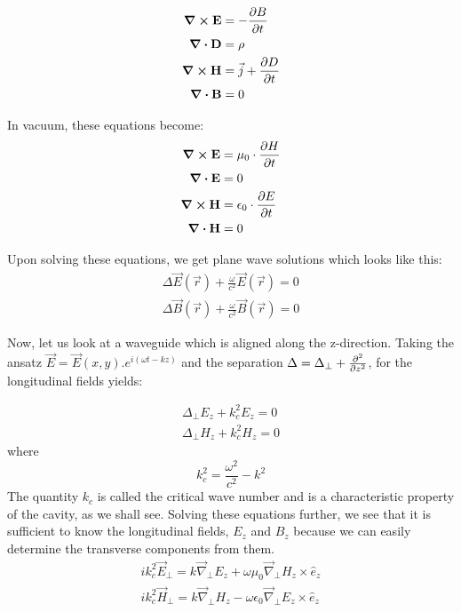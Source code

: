 \documentclass[a4paper]{report}
\numberwithin{equation}{section}
\begin{document}
\begin{align}
		\curl {\vb{{E}}} &= - \pdv{{B}}{t} \\
		\div{\vb{D}} &= \rho \\
		\curl {\vb{{H}}} &= \vec{j} + \pdv{{D}}{t} \\
		\div{\vb{{B}}} &= 0 
\end{align}

In vacuum, these equations become: 
\begin{align}
		\curl {\vb{{E}}} &= \mu_0 \cdot \pdv{{H}}{t} \\ 
		\div{\vb{{E}}} &= 0 \\
		\curl {\vb{{H}}} &= \epsilon_{0} \cdot \pdv{{E}}{t} \\
		\div{\vb{{H}}} &= 0
\end{align}

Upon solving these equations, we get plane wave solutions which looks like this: 
\begin{align*}
		\Delta \vec{E}\left(\vec{r}\right) + \frac{\omega}{c^2} \vec{E}\left(\vec{r}\right) = 0 \\
		\Delta \vec{B}\left(\vec{r}\right) + \frac{\omega}{c^2} \vec{B}\left(\vec{r}\right) = 0 
\end{align*}

Now, let us look at a waveguide which is aligned along the z-direction. Taking
the ansatz $\vec{E} = \vec{E}(x,y).e^{i(\omega t -kz)}$ and the separation
$\Delta = \Delta_{\perp} + \pdv[2]{}{z}$, for the longitudinal fields yields: 

\begin{align}
		\Delta_{\perp}E_{z} + k_{c}^2 E_{z} = 0 \\
		\Delta_{\perp}H_{z} + k_{c}^2 H_{z} = 0 
\end{align}
where 
\[
		k_{c}^2 = \frac{\omega^2 }{c^2 } - k^2   
\]
The quantity $k_{c} $ is called the critical wave number and is a characteristic
property of the cavity, as we shall see. Solving these equations further, we see
that it is sufficient to know the longitudinal fields, $E_{z} $ and $B_{z} $
because we can easily determine the transverse components from them. 
\begin{align} 
		ik_{c}^2 \vec{E}_{\perp} = k \vec{\nabla}_{\perp}E_{z} + \omega \mu _{0} \vec{\nabla}_{\perp}H_{z} \times \hat{e}_{z} \label{trans1} \\
		ik_{c}^2 \vec{H}_{\perp} = k \vec{\nabla}_{\perp}H_{z} - \omega \epsilon_{0} \vec{\nabla}_{\perp} E_{z} \times \hat{e}_{z} \label{trans2}     
\end{align}
\end{document}
